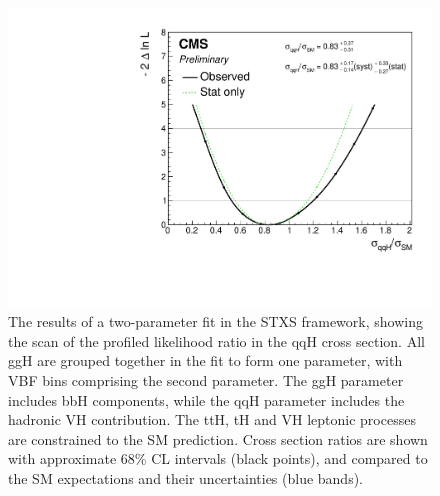 \begin{figure}[hptb]
\centering
\includegraphics[width=\textwidth]{Figures/Results/ObsStage0_r_qqH.pdf}
\caption{
  The results of a two-parameter fit in the STXS framework,
  showing the scan of the profiled likelihood ratio in the qqH cross section.
  All ggH are grouped together in the fit to form one parameter, 
  with VBF bins comprising the second parameter.
  The ggH parameter includes bbH components, 
  while the qqH parameter includes the hadronic VH contribution. 
  The ttH, tH and VH leptonic processes are constrained to the SM prediction. 
  Cross section ratios are shown with approximate 68\% CL intervals (black points), 
  and compared to the SM expectations and their uncertainties (blue bands).
}
\label{fig:results_Stage0_qqH}
\end{figure}

